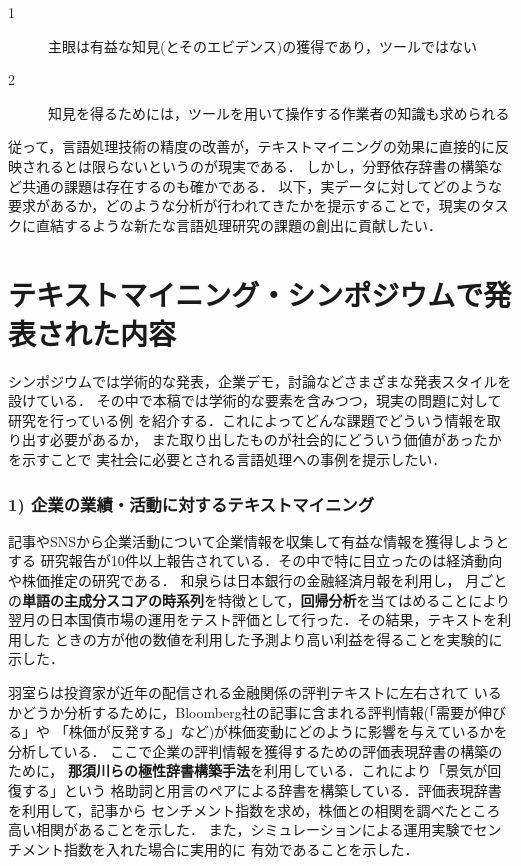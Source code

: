 \documentclass[twocolumn]{jarticle}
\begin{document}
\begin{description}
\item[1] 主眼は有益な知見(とそのエビデンス)の獲得であり，ツールではない
\item[2] 知見を得るためには，ツールを用いて操作する作業者の知識も求められる
\end{description}

従って，言語処理技術の精度の改善が，テキストマイニングの効果に直接的に反映されるとは限らないというのが現実である．
しかし，分野依存辞書の構築\cite{nasukawa04}など共通の課題は存在するのも確かである．
以下，実データに対してどのような要求があるか，どのような分析が行われてきたかを提示することで，現実のタスクに直結するような新たな言語処理研究の課題の創出に貢献したい．


\section{テキストマイニング・シンポジウムで発表された内容}
シンポジウムでは学術的な発表，企業デモ，討論などさまざまな発表スタイルを設けている．
その中で本稿では学術的な要素を含みつつ，現実の問題に対して研究を行っている例
を紹介する．これによってどんな課題でどういう情報を取り出す必要があるか，
また取り出したものが社会的にどういう価値があったかを示すことで
実社会に必要とされる言語処理への事例を提示したい．

\subsubsection*{1) 企業の業績・活動に対するテキストマイニング}

記事やSNSから企業活動について企業情報を収集して有益な情報を獲得しようとする
研究報告が10件以上報告されている．その中で特に目立ったのは経済動向や株価推定の研究である．
和泉ら\cite{izumi2011}は日本銀行の金融経済月報を利用し，
月ごとの{\bf 単語の主成分スコアの時系列}を特徴として，{\bf 回帰分析}を当てはめることにより
翌月の日本国債市場の運用をテスト評価として行った．その結果，テキストを利用した
ときの方が他の数値を利用した予測より高い利益を得ることを実験的に示した．

羽室ら\cite{hamuro2011}は投資家が近年の配信される金融関係の評判テキストに左右されて
いるかどうか分析するために，Bloomberg社の記事に含まれる評判情報(「需要が伸びる」や
「株価が反発する」など)が株価変動にどのように影響を与えているかを分析している．
ここで企業の評判情報を獲得するための評価表現辞書の構築のために，
{\bf 那須川ら\cite{nasukawa04}の極性辞書構築手法}を利用している．これにより「景気が回復する」という
格助詞と用言のペアによる辞書を構築している．評価表現辞書を利用して，記事から
センチメント指数を求め，株価との相関を調べたところ高い相関があることを示した．
また，シミュレーションによる運用実験でセンチメント指数を入れた場合に実用的に
有効であることを示した．
\end{document}
